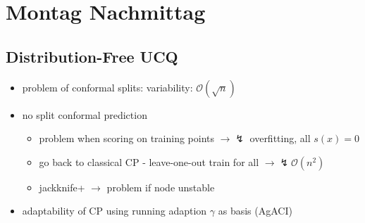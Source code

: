 \documentclass[a4paper]{article}
\begin{document}
\section*{Montag Nachmittag}
\subsection*{Distribution-Free UCQ}
\begin{itemize}
    \item problem of conformal splits: variability: $\mathcal{O}(\sqrt{n})$
    \item no split conformal prediction
          \begin{itemize}
              \item problem when scoring on training points $\rightarrow \lightning$  overfitting, all $s(x)=0$
              \item go back to classical CP - leave-one-out train for all $\rightarrow \lightning \mathcal{O}(n^2)$
              \item jackknife+ $\rightarrow$ problem if node unstable
          \end{itemize}
    \item adaptability of CP using running adaption $\gamma$ as basis (AgACI)
\end{itemize}
\end{document}
